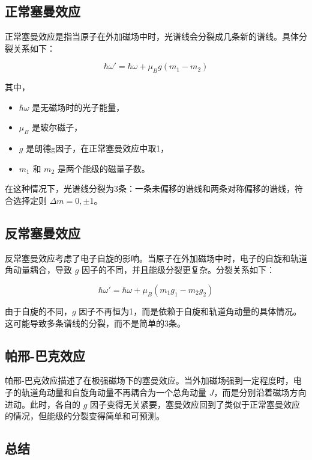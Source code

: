 \documentclass[dvipsnames, svgnames,a4paper,11pt]{article}
\begin{document}
\subsection*{正常塞曼效应 }

正常塞曼效应是指当原子在外加磁场中时，光谱线会分裂成几条新的谱线。具体分裂关系如下：

\begin{equation}
\hbar\omega' = \hbar\omega + \mu_B g (m_1 - m_2)
\end{equation}

其中，
\begin{itemize}
  \item $\hbar\omega$ 是无磁场时的光子能量，
  \item $\mu_B$ 是玻尔磁子，
  \item $g$ 是朗德g因子，在正常塞曼效应中取1，
  \item $m_1$ 和 $m_2$ 是两个能级的磁量子数。
\end{itemize}

在这种情况下，光谱线分裂为3条：一条未偏移的谱线和两条对称偏移的谱线，符合选择定则 $\Delta m = 0, \pm 1$。

\subsection*{反常塞曼效应 }

反常塞曼效应考虑了电子自旋的影响。当原子在外加磁场中时，电子的自旋和轨道角动量耦合，导致 $g$ 因子的不同，并且能级分裂更复杂。分裂关系如下：

\begin{equation}
\hbar\omega' = \hbar\omega + \mu_B (m_1 g_1 - m_2 g_2)
\end{equation}

由于自旋的不同，$g$ 因子不再恒为1，而是依赖于自旋和轨道角动量的具体情况。这可能导致多条谱线的分裂，而不是简单的3条。

\subsection*{帕邢-巴克效应 }

帕邢-巴克效应描述了在极强磁场下的塞曼效应。当外加磁场强到一定程度时，电子的轨道角动量和自旋角动量不再耦合为一个总角动量 $J$，而是分别沿着磁场方向进动。此时，各自的 $g$ 因子变得无关紧要，塞曼效应回到了类似于正常塞曼效应的情况，但能级的分裂变得简单和可预测。

\subsection*{总结}
\end{document}
